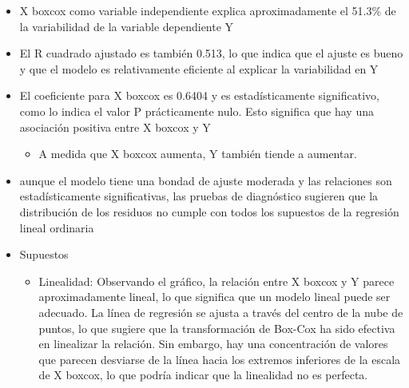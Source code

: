 \documentclass[11pt]{article}
\providecommand{\tightlist}{%
      \setlength{\itemsep}{0pt}\setlength{\parskip}{0pt}}
\begin{document}
    \begin{itemize}
\tightlist
\item
  X boxcox como variable independiente explica aproximadamente el 51.3\%
  de la variabilidad de la variable dependiente Y
\item
  El R cuadrado ajustado es también 0.513, lo que indica que el ajuste
  es bueno y que el modelo es relativamente eficiente al explicar la
  variabilidad en Y
\item
  El coeficiente para X boxcox es 0.6404 y es estadísticamente
  significativo, como lo indica el valor P prácticamente nulo. Esto
  significa que hay una asociación positiva entre X boxcox y Y

  \begin{itemize}
  \tightlist
  \item
    A medida que X boxcox aumenta, Y también tiende a aumentar.
  \end{itemize}
\item
  aunque el modelo tiene una bondad de ajuste moderada y las relaciones
  son estadísticamente significativas, las pruebas de diagnóstico
  sugieren que la distribución de los residuos no cumple con todos los
  supuestos de la regresión lineal ordinaria
\end{itemize}

    \begin{itemize}
\tightlist
\item
  Supuestos

  \begin{itemize}
  \tightlist
  \item
    Linealidad: Observando el gráfico, la relación entre X boxcox y Y
    parece aproximadamente lineal, lo que significa que un modelo lineal
    puede ser adecuado. La línea de regresión se ajusta a través del
    centro de la nube de puntos, lo que sugiere que la transformación de
    Box-Cox ha sido efectiva en linealizar la relación. Sin embargo, hay
    una concentración de valores que parecen desviarse de la línea hacia
    los extremos inferiores de la escala de X boxcox, lo que podría
    indicar que la linealidad no es perfecta.
  \end{itemize}
\end{itemize}


    
    
    
\end{document}
